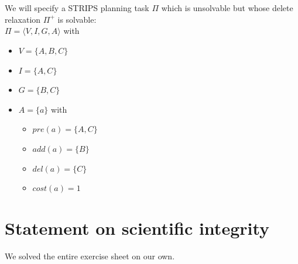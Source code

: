\documentclass{article} %
\begin{document}
\section{}
We will specify a STRIPS planning task $\Pi$ which
is unsolvable but whose delete relaxation $\Pi^+$
is solvable:\\[0.5em]
$\Pi = \langle
    V, I, G, A
\rangle$ with
\begin{itemize}
    \item $V = \{ A, B, C \}$
    \item $I = \{ A, C \}$
    \item $G = \{ B, C \}$
    \item $A = \{ a \}$ with
    \begin{itemize}
        \item $pre(a) = \{ A, C \}$
        \item $add(a) = \{ B \}$
        \item $del(a) = \{ C \}$
        \item $cost(a) = 1$
    \end{itemize}
\end{itemize}

\section*{Statement on scientific integrity}
We solved the entire exercise sheet on our own.
\end{document}
